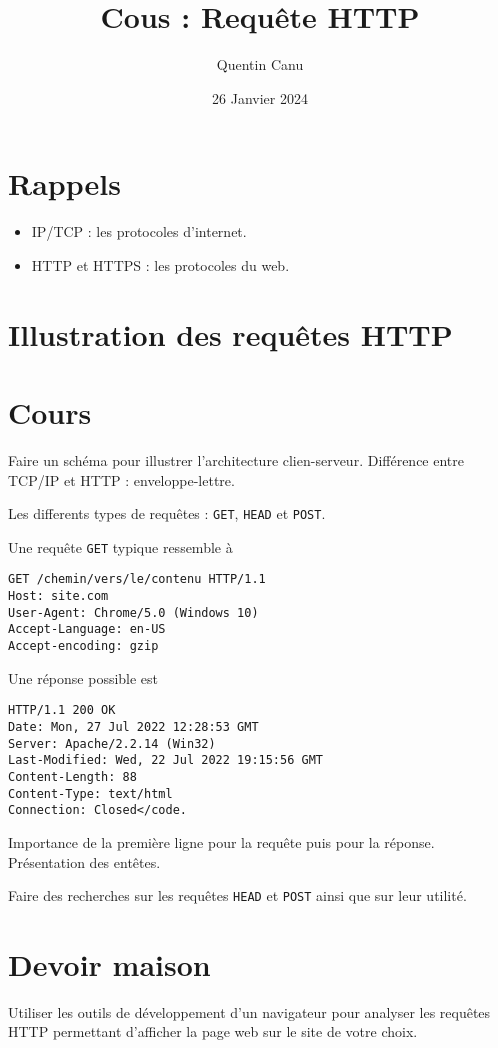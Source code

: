 \documentclass{article}
\title{Cous : Requête HTTP}
\author{Quentin Canu}
\date{26 Janvier 2024}
\begin{document}
\maketitle
\section{Rappels}
\begin{itemize}
\item IP/TCP : les protocoles d'internet.
\item HTTP et HTTPS : les protocoles du web.
\end{itemize}
\section{Illustration des requêtes HTTP}
\section{Cours}
Faire un schéma pour illustrer l'architecture clien-serveur. Différence entre TCP/IP et HTTP : enveloppe-lettre.

Les differents types de requêtes : \verb|GET|, \verb|HEAD| et \verb|POST|.

Une requête \verb|GET| typique ressemble à

\begin{verbatim}
GET /chemin/vers/le/contenu HTTP/1.1
Host: site.com
User-Agent: Chrome/5.0 (Windows 10)
Accept-Language: en-US
Accept-encoding: gzip
\end{verbatim}

Une réponse possible est 

\begin{verbatim}
HTTP/1.1 200 OK
Date: Mon, 27 Jul 2022 12:28:53 GMT
Server: Apache/2.2.14 (Win32)
Last-Modified: Wed, 22 Jul 2022 19:15:56 GMT
Content-Length: 88
Content-Type: text/html
Connection: Closed</code.
\end{verbatim}

Importance de la première ligne pour la requête puis pour la réponse. Présentation des entêtes. 

Faire des recherches sur les requêtes \verb|HEAD| et \verb|POST| ainsi que sur leur utilité.

\section{Devoir maison}
Utiliser les outils de développement d'un navigateur pour analyser les requêtes HTTP permettant d'afficher la page web sur le site de votre choix.
\end{document}
